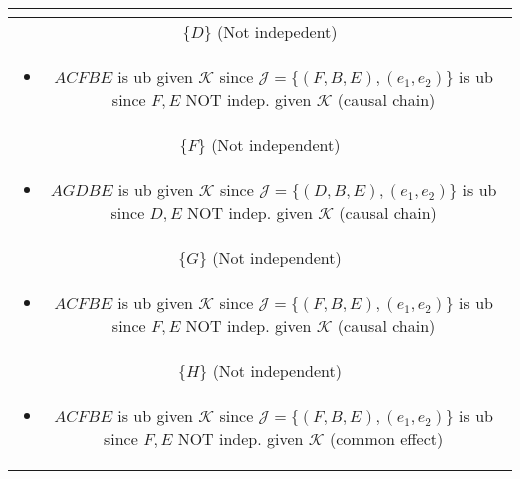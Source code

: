 \begin{example}
\begin{center}
\begin{tabular}{c}
{\begin{itemize}
                \end{itemize}} \\
            \midrule
            $\{D\}$ (Not indepedent) \\
            \multicolumn{1}{p{\linewidth}}{
                \begin{itemize}
                    \item $ACFBE$ is ub given $\mathcal{K}$ since $\mathcal{J} = \{(F,B,E),(e_1,e_2)\}$ is ub since $F,E$ NOT indep. given $\mathcal{K}$ (causal chain)
                \end{itemize}} \\
            \midrule
            $\{F\}$ (Not independent) \\
            \multicolumn{1}{p{\linewidth}}{
                \begin{itemize}
                    \item $AGDBE$ is ub given $\mathcal{K}$ since $\mathcal{J} = \{(D,B,E),(e_1,e_2)\}$ is ub since $D,E$ NOT indep. given $\mathcal{K}$ (causal chain)
                \end{itemize}} \\
            \midrule
            $\{G\}$ (Not independent) \\
            \multicolumn{1}{p{\linewidth}}{
                \begin{itemize}
                    \item $ACFBE$ is ub given $\mathcal{K}$ since $\mathcal{J} = \{(F,B,E),(e_1,e_2)\}$ is ub since $F,E$ NOT indep. given $\mathcal{K}$ (causal chain)
                \end{itemize}} \\
            \midrule
            $\{H\}$ (Not independent) \\
            \multicolumn{1}{p{\linewidth}}{
                \begin{itemize}
                    \item $ACFBE$ is ub given $\mathcal{K}$ since $\mathcal{J} = \{(F,B,E),(e_1,e_2)\}$ is ub since $F,E$ NOT indep. given $\mathcal{K}$ (common effect)
                \end{itemize}} \\
            \toprule
        \end{tabular}
    \end{center}
\end{example}
\newpage

